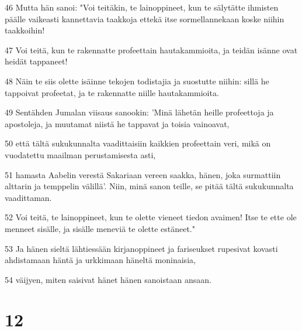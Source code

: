 \par 46 Mutta hän sanoi: "Voi teitäkin, te lainoppineet, kun te sälytätte ihmisten päälle vaikeasti kannettavia taakkoja ettekä itse sormellannekaan koske niihin taakkoihin!
\par 47 Voi teitä, kun te rakennatte profeettain hautakammioita, ja teidän isänne ovat heidät tappaneet!
\par 48 Näin te siis olette isäinne tekojen todistajia ja suostutte niihin: sillä he tappoivat profeetat, ja te rakennatte niille hautakammioita.
\par 49 Sentähden Jumalan viisaus sanookin: 'Minä lähetän heille profeettoja ja apostoleja, ja muutamat niistä he tappavat ja toisia vainoavat,
\par 50 että tältä sukukunnalta vaadittaisiin kaikkien profeettain veri, mikä on vuodatettu maailman perustamisesta asti,
\par 51 hamasta Aabelin verestä Sakariaan vereen saakka, hänen, joka surmattiin alttarin ja temppelin välillä'. Niin, minä sanon teille, se pitää tältä sukukunnalta vaadittaman.
\par 52 Voi teitä, te lainoppineet, kun te olette vieneet tiedon avaimen! Itse te ette ole menneet sisälle, ja sisälle meneviä te olette estäneet."
\par 53 Ja hänen sieltä lähtiessään kirjanoppineet ja fariseukset rupesivat kovasti ahdistamaan häntä ja urkkimaan häneltä moninaisia,
\par 54 väijyen, miten saisivat hänet hänen sanoistaan ansaan.

\chapter{12}

